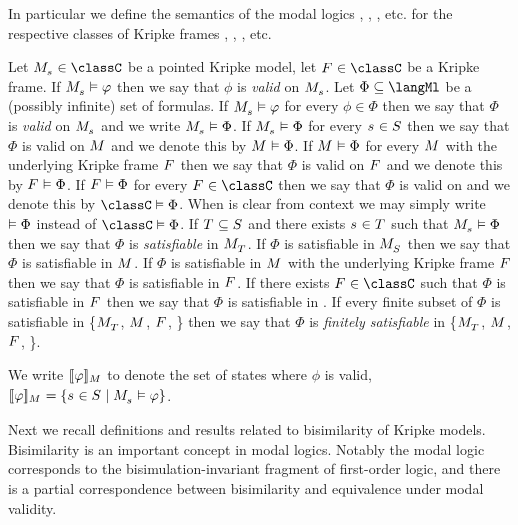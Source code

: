 In particular we define the semantics of the modal logics \logicK{}, \logicKF{}, \logicKFF{}, etc. for the respective classes of Kripke frames \classK{}, \classKF{}, \classKFF{}, etc.

Let $\kPModel{\kStateS} \in \classC$ be a pointed Kripke model,
let $\kFrame \in \classC$ be a Kripke frame.
If $\kPModel{\kStateS} \entails \phi$ then we say that $\phi$ is {\em valid} on $\kPModel{\kStateS}$.
Let $\Phi \subseteq \langMl$ be a (possibly infinite) set of formulas.
If $\kPModel{\kStateS} \entails \phi$ for every $\phi \in \Phi$ then we say that $\Phi$ is {\em valid} on $\kPModel{\kStateS}$ and we write $\kPModel{\kStateS} \entails \Phi$.
If $\kPModel{\kStateS} \entails \Phi$ for every $\kStateS \in \kStates$ then we say that $\Phi$ is valid on $\kModel$ and we denote this by $\kModel \entails \Phi$.
If $\kModel \entails \Phi$ for every $\kModel$ with the underlying Kripke frame $\kFrame$ then we say that $\Phi$ is valid on $\kFrame$ and we denote this by $\kFrame \entails \Phi$.
If $\kFrame \entails \Phi$ for every $\kFrame \in \classC$ then we say that $\Phi$ is valid on \classC{} and we denote this by $\classC \entails \Phi$.
When \classC{} is clear from context we may simply write $\vDash \Phi$ instead of $\classC \entails \Phi$.
If $\kStatesT \subseteq \kStates$ and there exists $\kStateS \in \kStatesT$ such that $\kPModel{\kStateS} \entails \Phi$ then we say that $\Phi$ is {\em satisfiable} in $\kPModel{\kStatesT}$.
If $\Phi$ is satisfiable in $\kPModel{\kStates}$ then we say that $\Phi$ is satisfiable in $\kModel$.
If $\Phi$ is satisfiable in $\kModel$ with the underlying Kripke frame $\kFrame$ then we say that $\Phi$ is satisfiable in $\kFrame$.
If there exists $\kFrame \in \classC$ such that $\Phi$ is satisfiable in $\kFrame$ then we say that $\Phi$ is satisfiable in \classC{}.
If every finite subset of $\Phi$ is satisfiable in \{$\kPModel{\kStatesT}$, $\kModel$, $\kFrame$, \classC{}\} then we say that $\Phi$ is {\em finitely satisfiable} in \{$\kPModel{\kStatesT}$, $\kModel$, $\kFrame$, \classC{}\}.

We write $\interpretation[\kModel]{\phi}$ to denote the set of states where $\phi$ is valid, $\interpretation[\kModel]{\phi} = \{\kStateS \in \kStates \mid \kPModel{\kStateS} \entails \phi\}$.

Next we recall definitions and results related to bisimilarity of Kripke models.
Bisimilarity is an important concept in modal logics.
Notably the modal logic \logicK{} corresponds to the bisimulation-invariant fragment of first-order logic, and there is a partial correspondence between bisimilarity and equivalence under modal validity.

